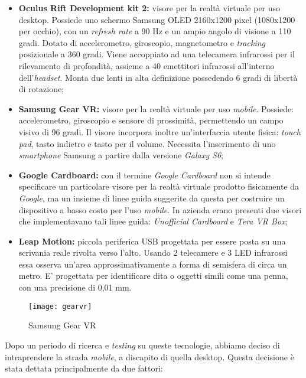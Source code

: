 \begin{itemize}
	\item \textbf{Oculus Rift Development kit 2:} visore per la realtà virtuale per uso desktop. Possiede uno schermo Samsung OLED 2160x1200 pixel (1080x1200 per occhio), con un \textit{refresh rate} a 90 Hz e un ampio angolo di visione a 110 gradi. Dotato di accelerometro, giroscopio, magnetometro e \textit{tracking} posizionale a 360 gradi. Viene accoppiato ad una telecamera infrarossi per il rilevamento di profondità, assieme a 40 emettitori infrarossi all'interno dell'\textit{headset}. Monta due lenti in alta definizione possedendo 6 gradi di libertà di rotazione;
	
	\item \textbf{Samsung Gear VR:} visore per la realtà virtuale per uso \textit{mobile}. Possiede: accelerometro, giroscopio e sensore di prossimità, permettendo un campo visivo di 96 gradi. Il visore incorpora inoltre un'interfaccia utente fisica: \textit{touch pad}, tasto indietro e tasto per il volume. Necessita l'inserimento di uno \textit{smartphone} Samsung a partire dalla versione \textit{Galaxy S6};
	
	\item \textbf{Google Cardboard:} con il termine \textit{Google Cardboard} non si intende specificare un particolare visore per la realtà virtuale prodotto fisicamente da \textit{Google}, ma un insieme di linee guida suggerite da questa per costruire un dispositivo a basso costo per l'uso \textit{mobile}. In azienda erano presenti due visori che implementavano tali linee guida: \textit{Unofficial Cardboard} e \textit{Tera VR Box};
	
	\item \textbf{Leap Motion:} piccola periferica USB  progettata per essere posta su una scrivania reale rivolta verso l'alto. Usando 2 telecamere e 3 LED infrarossi essa osserva un'area approssimativamente a forma di semisfera di circa un metro. E' progettata per identificare dita o oggetti simili come una penna, con una precisione di 0,01 mm. 
\end{itemize}

\label{Gear VR}
\begin{figure}[ht]
	\begin{center}
		\texttt{[image: gearvr]}
		\caption{Samsung Gear VR}
	\end{center}
\end{figure}
\FloatBarrier

Dopo un periodo di ricerca e \textit{testing} su queste tecnologie, abbiamo deciso di intraprendere la strada \textit{mobile}, a discapito di quella desktop. Questa decisione è stata dettata principalmente da due fattori:


